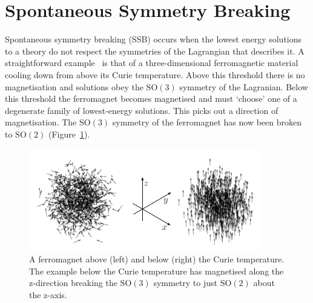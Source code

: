 \section{Spontaneous Symmetry Breaking}
Spontaneous symmetry breaking (SSB) occurs when the lowest energy solutions to a theory do not respect the symmetries of the Lagrangian that describes it. 
A straightforward example~\cite{Maggiore} is that of a three-dimensional ferromagnetic material cooling down from above its Curie temperature.
Above this threshold there is no magnetisation and solutions obey the $\mathrm{SO}(3)$ symmetry of the Lagranian. 
Below this threshold the ferromagnet becomes magnetised and must `choose' one of a degenerate family of lowest-energy solutions. This picks out a direction of magnetisation. The $\mathrm{SO}(3)$ symmetry of the ferromagnet has now been broken to $\mathrm{SO}(2)$ (Figure~\ref{fig:theory:ferromagnet_ssb}).

\begin{figure}[h!]
    \centering
\includegraphics[width=0.9\textwidth]{figures/theory/ferromagnet_ssb.pdf}
\caption{A ferromagnet above (left) and below (right) the Curie temperature. The example below the Curie temperature has magnetised along the z-direction breaking the $\mathrm{SO}(3)$ symmetry to just $\mathrm{SO}(2)$ about the z-axis.}
\label{fig:theory:ferromagnet_ssb}
\end{figure}

